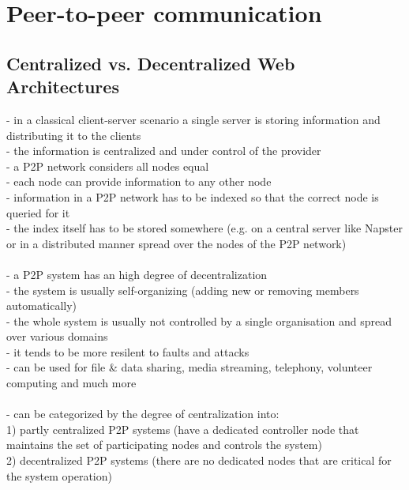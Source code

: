 
\section{Peer-to-peer communication}
\label{sec:p2p_communication}

\subsection{Centralized vs. Decentralized Web Architectures}

- in a classical client-server scenario a single server is storing information and distributing it to the clients \\
- the information is centralized and under control of the provider \\

- a P2P network considers all nodes equal \\
- each node can provide information to any other node \\
- information in a P2P network has to be indexed so that the correct node is queried for it \\
- the index itself has to be stored somewhere (e.g. on a central server like Napster or in a distributed manner spread over the nodes of the P2P network) \\
\\
- a P2P system has an high degree of decentralization \\
- the system is usually self-organizing (adding new or removing members automatically) \\
- the whole system is usually not controlled by a single organisation and spread over various domains \\
- it tends to be more resilent to faults and attacks \\
- can be used for file \& data sharing, media streaming, telephony, volunteer computing and much more \\
\\
- can be categorized by the degree of centralization into: \\
  1) partly centralized P2P systems (have a dedicated controller node that maintains the set of participating nodes and controls the system) \\
  2) decentralized P2P systems (there are no dedicated nodes that are critical for the system operation) \\
\\
\label{sec:central_decentral_arch}

